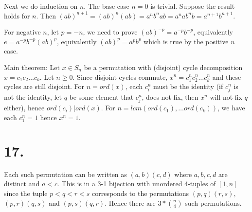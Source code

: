 \documentclass{article}
\begin{document}
Next we do induction on $n$. The base case $n=0$ is trivial. Suppose the result holds for $n$. Then $(ab)^{n+1} = (ab)^n(ab) = a^nb^na b = a^n a b^n b = a^{n+1}b^{n+1}$.

For negative $n$, let $p = -n$, we need to prove $(ab)^{-p} = a^{-p}b^{-p}$, equivalently $e = a^{-p}b^{-p} (ab)^p$, equivalently $(ab)^p = a^pb^p$ which is true by the positive $n$ case.

Main theorem: Let $x \in S_n$ be a permutation with (disjoint) cycle decomposition $x = c_1c_2\ldots c_k$. Let $n \ge 0$. Since disjoint cycles commute, $x^n = c_1^n c_2^n \ldots c_k^n$ and these cycles are still disjoint. For $n = ord(x)$, each $c_i^n$ must be the identity (if $c_j^n$ is not the identity, let $q$ be some element that $c_j^n$, does not fix, then $x^n$ will not fix $q$ either), hence $ord(c_i) | ord(x)$. For $n = lcm(ord(c_1), \ldots ord(c_k))$, we have each $c_1^n = 1$ hence $x^n = 1$.

\section*{17.}

Each such permutation can be written as $(a, b)(c, d)$ where $a, b, c, d$ are distinct and $a < c$. This is in a 3-1 bijection with unordered 4-tuples of $[1, n]$ since the tuple $p < q < r < s$ corresponds to the permutations $(p, q)(r, s)$, $(p, r)(q, s)$ and $(p, s)(q, r)$. Hence there are $3*\binom{n}{4}$ such permutations.
\end{document}
